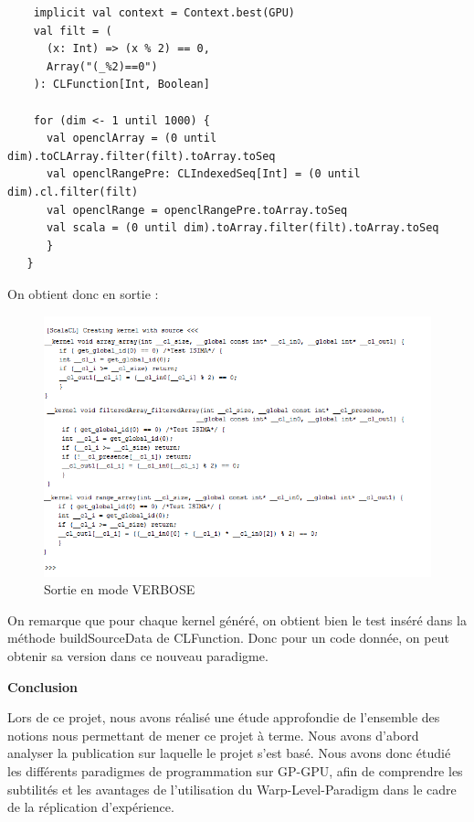 \documentclass[a4paper,11pt]{report}
\begin{document}
{{{\begin{lstlisting}
    implicit val context = Context.best(GPU)
    val filt = (
      (x: Int) => (x % 2) == 0, 
      Array("(_%2)==0")
    ): CLFunction[Int, Boolean]
    
    for (dim <- 1 until 1000) {
      val openclArray = (0 until dim).toCLArray.filter(filt).toArray.toSeq
      val openclRangePre: CLIndexedSeq[Int] = (0 until dim).cl.filter(filt)
      val openclRange = openclRangePre.toArray.toSeq
      val scala = (0 until dim).toArray.filter(filt).toArray.toSeq
      }
   }
\end{lstlisting}

\vspace{6mm}
\normalsize{
\noindent
On obtient donc en sortie :
}

\begin{figure}[h]
   \begin{center}
   \includegraphics[scale = 0.9]{resultats.png}
   \end{center}
  \caption{Sortie en mode VERBOSE}
\end{figure}
\newpage
\normalsize{
On remarque que pour chaque kernel généré, on obtient bien le test inséré dans la méthode buildSourceData de CLFunction. Donc pour un code donnée, on peut obtenir sa version dans ce nouveau paradigme.
}




\newpage
\begin{flushleft}
\LARGE{ \bf {Conclusion}\bigskip}
\end{flushleft}
\vspace{10mm}
\normalsize
{

Lors de ce projet, nous avons réalisé une étude approfondie de l'ensemble des notions nous permettant de mener ce projet à terme. Nous avons d'abord analyser la publication sur laquelle le projet s'est basé. Nous avons donc étudié les différents paradigmes de programmation sur GP-GPU, afin de comprendre les subtilités et les avantages de l'utilisation du Warp-Level-Paradigm dans le cadre de la réplication d'expérience.\\ 

}}}}
\end{document}
